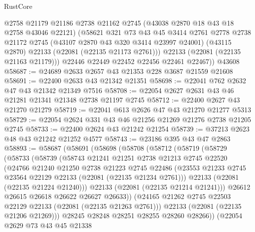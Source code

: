 \begin{lexlean}{RustCore}
\begin{coremodule}
          @2758
          @21179
          @21186
          @2738
          @21162
          @2745
          (@43038 @2870 @18 @43 @18 @2758 @43046 @22121)
          (@58621
            @321
            @73
            @43
            @45
            @3414
            @2761
            @2778
            @2738
            @21172
            @2745
            (@43107 @2870 @43 @320 @3414 @23997 @24001)
            (@43115 @2870)
            @22133
            (@22081 (@22135 @21173 @2761)))
          @22133
          (@22081 (@22135 @21163 @21179)))
        @22446
        @22449
        @22452
        @22456
        @22461
        @22467))
    @43608
@58687 := @24689 @2633 @2657 @43 @21353 @228 @3687 @21559 @21608
@58691 := @22400 @2633 @43 @21342 @21351
@58698 := @22041 @762 @2632 @47 @43 @21342 @21349 @7516
@58708 := @22054 @2627 @2631 @43 @46 @21281 @21341 @21348 @2738 @21197 @2745
@58712 := @22400 @2627 @43 @21270 @21279
@58719 := @22041 @613 @2626 @47 @43 @21270 @21277 @5313
@58729 := @22054 @2624 @331 @43 @46 @21256 @21269 @21276 @2738 @21205 @2745
@58733 := @22400 @2624 @43 @21242 @21254
@58739 := @37213 @2623 @48 @43 @21242 @21252 @4577
@58743 := @23186 @395 @43 @47 @2863
@58893 := @58687
    (@58691
      (@58698
        (@58708
          (@58712
            (@58719
              (@58729
                (@58733
                  (@58739
                    (@58743
                      @21241
                      @21251
                      @2738
                      @21213
                      @2745
                      @22520
                      (@24766
                        @21240
                        @21250
                        @2738
                        @21223
                        @2745
                        @22486
                        (@23553 @21233 @2745 @23564 @22129 @22133 (@22081 (@22135 @21234 @2761)))
                        @22133
                        (@22081 (@22135 @21224 @21240)))
                      @22133
                      (@22081 (@22135 @21214 @21241)))
                    @26612
                    @26615
                    @26618
                    @26622
                    @26627
                    @26633))
                (@24165 @21262 @2745 @22503 @22129 @22133 (@22081 (@22135 @21263 @2761)))
                @22133
                (@22081 (@22135 @21206 @21269)))
              @28245
              @28248
              @28251
              @28255
              @28260
              @28266))
          (@22054
            @2629
            @73
            @43
            @45
            @21338

\end{coremodule}
\end{lexlean}
